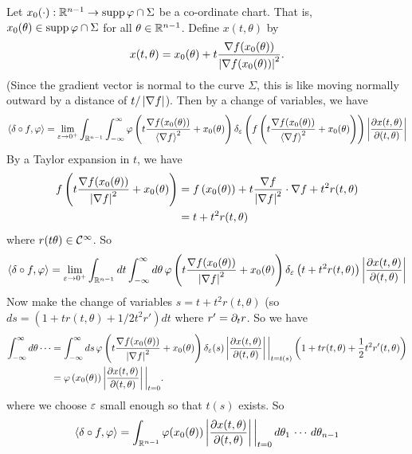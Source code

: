 \begin{exam}
\begin{enum}
    Let $x_0(\cdot): \mathbb{R}^{n-1} \to \operatorname{supp}\varphi\cap\Sigma$ be a co-ordinate chart.
    That is, $x_0(\theta)\in\operatorname{supp}\varphi\cap\Sigma$ for all $\theta\in\mathbb{R}^{n-1}$.
    Define $x(t,\theta)$ by
    \[ x(t,\theta)=x_0(\theta)+t\frac{\nabla f(x_0(\theta))}{\left\lvert \nabla f(x_0(\theta)) \right\rvert^2}. \]
    (Since the gradient vector is normal to the curve $\Sigma$, this is like moving normally outward by a distance of $t/\left\lvert \nabla f \right\rvert$).
    Then by a change of variables, we have
    \begin{equation*}
      {\left\langle \delta\circ f,\varphi\right\rangle} = \lim_{\varepsilon\to0^+} \int_{\mathbb{R}^{n-1}} \int_{-\infty}^\infty \varphi\left( t\frac{\nabla f(x_0(\theta))}{{\left\langle \nabla f \right\rangle}^2} + x_0(\theta) \right) \delta_\varepsilon\left( f\left( t\frac{\nabla f(x_0(\theta))}{{\left\langle \nabla f \right\rangle}^2} + x_0(\theta) \right) \right) \left\lvert \frac{\partial x(t,\theta)}{\partial(t,\theta)} \right\rvert
    \end{equation*}
    By a Taylor expansion in $t$, we have
    \begin{align*}
      f\left( t\frac{\nabla f(x_0(\theta))}{\left\lvert \nabla f \right\rvert^2} + x_0(\theta) \right) &= f\left( x_0(\theta) \right) + t \frac{\nabla f}{\left\lvert \nabla f \right\rvert^2} \cdot\nabla f + t^2 r(t,\theta) \\
      &= t+t^2r(t,\theta)
    \end{align*}
    where $r(t\theta)\in\mathcal{C}^\infty$.
    So
    \begin{equation*}
      {\left\langle \delta\circ f,\varphi\right\rangle} = \lim_{\varepsilon\to0^+} \int_{\mathbb{R}^{n-1}} dt \int_{-\infty}^\infty d\theta \, \varphi\left( t\frac{\nabla f(x_0(\theta))}{\left\lvert \nabla f \right\rvert^2} + x_0(\theta) \right) \delta_\varepsilon\left( t+t^2r(t,\theta) \right) \left\lvert \frac{\partial x(t,\theta)}{\partial(t,\theta)} \right\rvert
    \end{equation*}
    Now make the change of variables $s=t+t^2r(t,\theta)$ (so $ds=(1+tr(t,\theta)+1/2t^2r')dt$ where $r'=\partial_tr$.
    So we have
    \begin{align*}
      \int_{-\infty}^\infty d\theta \cdots &= \int_{-\infty}^\infty ds \, \varphi\left( t\frac{\nabla f(x_0(\theta))}{\left\lvert \nabla f \right\rvert^2} + x_0(\theta) \right) \delta_\varepsilon(s) \left\lvert \frac{\partial x(t,\theta)}{\partial(t,\theta)} \right\rvert\bigg\vert_{t=t(s)} \left( 1+tr(t,\theta)+\frac12t^2r'(t,\theta) \right) \\
      &= \varphi\left( x_0(\theta) \right) \left\lvert \frac{\partial x(t,\theta)}{\partial(t,\theta)} \right\rvert\bigg\vert_{t=0}.
    \end{align*}
    where we choose $\varepsilon$ small enough so that $t(s)$ exists.
    So
    \begin{align*}
      \ang{\delta\circ f,\ph} &= \int_{\RR^{n-1}} \ph(x_0(\theta)) \abs{\frac{\p x(t,\theta)}{\p(t,\theta)}}\bigg\vert_{t=0} \, d\theta_1 \, \cdots \, d\theta_{n-1} \\

\end{align*}
\end{enum}
\end{exam}
